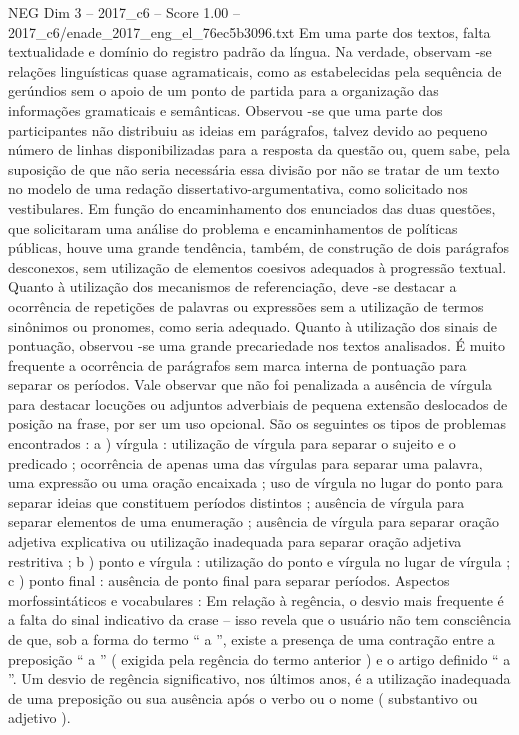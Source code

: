 \begin{textsample}{NEG Dim 3 – 2017\_c6 – Score 1.00 – 2017\_c6/enade\_2017\_eng\_el\_76ec5b3096.txt}
Em uma parte dos textos, falta textualidade e domínio do registro padrão da língua.
Na verdade, observam -se relações linguísticas quase agramaticais, como as estabelecidas pela sequência de gerúndios sem o apoio de um ponto de partida para a organização das informações gramaticais e semânticas.
Observou -se que uma parte dos participantes não distribuiu as ideias em parágrafos, talvez devido ao pequeno número de linhas disponibilizadas para a resposta da questão ou, quem sabe, pela suposição de que não seria necessária essa divisão por não se tratar de um texto no modelo de uma redação dissertativo-argumentativa, como solicitado nos vestibulares.
Em função do encaminhamento dos enunciados das duas questões, que solicitaram uma análise do problema e encaminhamentos de políticas públicas, houve uma grande tendência, também, de construção de dois parágrafos desconexos, sem utilização de elementos coesivos adequados à progressão textual.
Quanto à utilização dos mecanismos de referenciação, deve -se destacar a ocorrência de repetições de palavras ou expressões sem a utilização de termos sinônimos ou pronomes, como seria adequado.
Quanto à utilização dos sinais de pontuação, observou -se uma grande precariedade nos textos analisados.
É muito frequente a ocorrência de parágrafos sem marca interna de pontuação para separar os períodos.
Vale observar que não foi penalizada a ausência de vírgula para destacar locuções ou adjuntos adverbiais de pequena extensão deslocados de posição na frase, por ser um uso opcional.
São os seguintes os tipos de problemas encontrados : a ) vírgula : utilização de vírgula para separar o sujeito e o predicado ; ocorrência de apenas uma das vírgulas para separar uma palavra, uma expressão ou uma oração encaixada ; uso de vírgula no lugar do ponto para separar ideias que constituem períodos distintos ; ausência de vírgula para separar elementos de uma enumeração ; ausência de vírgula para separar oração adjetiva explicativa ou utilização inadequada para separar oração adjetiva restritiva ; b ) ponto e vírgula : utilização do ponto e vírgula no lugar de vírgula ; c ) ponto final : ausência de ponto final para separar períodos.
Aspectos morfossintáticos e vocabulares : Em relação à regência, o desvio mais frequente é a falta do sinal indicativo da crase – isso revela que o usuário não tem consciência de que, sob a forma do termo “ a ”, existe a presença de uma contração entre a preposição “ a ” ( exigida pela regência do termo anterior ) e o artigo definido “ a ”.
Um desvio de regência significativo, nos últimos anos, é a utilização inadequada de uma preposição ou sua ausência após o verbo ou o nome ( substantivo ou adjetivo ).

\end{textsample}
